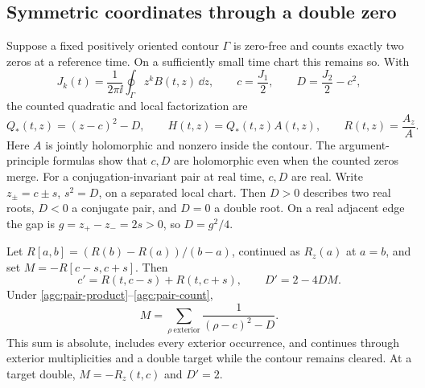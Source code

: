 \subsection{Symmetric coordinates through a double zero}

Suppose a fixed positively oriented contour $\Gamma$ is zero-free and
counts exactly two zeros at a reference time. On a sufficiently small
time chart this remains so. With
\[
 J_k(t)=\frac1{2\pi\ii}\oint_\Gamma z^k B(t,z)\,\dd z,
 \qquad c=\frac{J_1}{2},\qquad D=\frac{J_2}{2}-c^2,
\]
the counted quadratic and local factorization are
\begin{equation}
 Q_*(t,z)=(z-c)^2-D,\qquad H(t,z)=Q_*(t,z)A(t,z),
 \qquad R(t,z)=\frac{A_z}{A}.
 \label{agc:pair-deflation}
\end{equation}
Here $A$ is jointly holomorphic and nonzero inside the contour. The
argument-principle formulas show that $c,D$ are holomorphic even when
the counted zeros merge. For a conjugation-invariant pair at real time,
$c,D$ are real. Write $z_\pm=c\pm s$, $s^2=D$, on a separated local
chart. Then $D>0$ describes two real roots, $D<0$ a conjugate pair,
and $D=0$ a double root. On a real adjacent edge the gap is
$g=z_+-z_-=2s>0$, so $D=g^2/4$.

\begin{proposition}
\label{agc:pair-law-prop}
Let $R[a,b]=(R(b)-R(a))/(b-a)$, continued as $R_z(a)$ at
$a=b$, and set $M=-R[c-s,c+s]$. Then
\begin{equation}
 c'=R(t,c-s)+R(t,c+s),\qquad
 D'=2-4DM.
 \label{agc:pair-law}
\end{equation}
Under \eqref{agc:pair-product}--\eqref{agc:pair-count},
\begin{equation}
 M=\sum_{\rho\ \mathrm{exterior}}
       \frac1{(\rho-c)^2-D}.
 \label{agc:pair-M}
\end{equation}
This sum is absolute, includes every exterior occurrence, and continues
through exterior multiplicities and a double target while the contour
remains cleared. At a target double, $M=-R_z(t,c)$ and $D'=2$.
\end{proposition}

